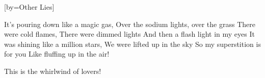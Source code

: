 [by={Other Lies}]

  \chordsoff

  
  \beginverse
  \endverse

  \beginchorus
  \endchorus

  \beginverse
  It’s pouring down like a magic gas,
  Over the sodium lights, over the grass
  There were cold flames,
  There were dimmed lights
  And then a flash light in my eyes
  It was shining like a million stars,
  We were lifted up in the sky
  So my superstition is for you
  Like fluffing up in the air!
  \endverse

  \beginchorus
  This is the whirlwind of lovers!
  \endchorus

  
\endsong
